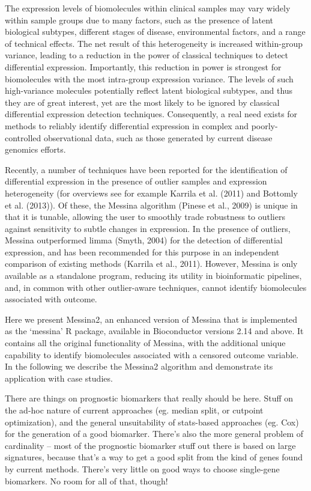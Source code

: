 \documentclass[dissertation.tex]{subfiles}
\begin{document}
The expression levels of biomolecules within clinical samples may vary widely within sample groups due to many factors, such as the presence of latent biological subtypes, different stages of disease, environmental factors, and a range of technical effects. The net result of this heterogeneity is increased within-group variance, leading to a reduction in the power of classical techniques to detect differential expression. Importantly, this reduction in power is strongest for biomolecules with the most intra-group expression variance. The levels of such high-variance molecules potentially reflect latent biological subtypes, and thus they are of great interest, yet are the most likely to be ignored by classical differential expression detection techniques. Consequently, a real need exists for methods to reliably identify differential expression in complex and poorly-controlled observational data, such as those generated by current disease genomics efforts.

Recently, a number of techniques have been reported for the identification of differential expression in the presence of outlier samples and expression heterogeneity (for overviews see for example Karrila et al. (2011) and Bottomly et al. (2013)). Of these, the Messina algorithm (Pinese et al., 2009) is unique in that it is tunable, allowing the user to smoothly trade robustness to outliers against sensitivity to subtle changes in expression. In the presence of outliers, Messina outperformed limma (Smyth, 2004) for the detection of differential expression, and has been recommended for this purpose in an independent comparison of existing methods (Karrila et al., 2011). However, Messina is only available as a standalone program, reducing its utility in bioinformatic pipelines, and, in common with other outlier-aware techniques, cannot identify biomolecules associated with outcome.

Here we present Messina2, an enhanced version of Messina that is implemented as the ‘messina’ R package, available in Bioconductor versions 2.14 and above. It contains all the original functionality of Messina, with the additional unique capability to identify biomolecules associated with a censored outcome variable. In the following we describe the Messina2 algorithm and demonstrate its application with case studies.

There are things on prognostic biomarkers that really should be here. Stuff on the ad-hoc nature of current approaches (eg. median split, or cutpoint optimization), and the general unsuitability of stats-based approaches (eg. Cox) for the generation of a good biomarker. There’s also the more general problem of cardinality – most of the prognostic biomarker stuff out there is based on large signatures, because that’s a way to get a good split from the kind of genes found by current methods. There’s very little on good ways to choose single-gene biomarkers. No room for all of that, though!
\end{document}
